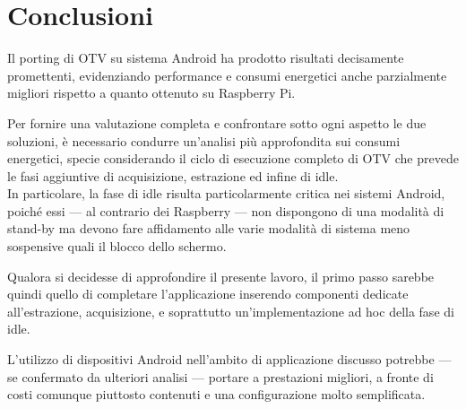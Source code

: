 \chapter*{Conclusioni}
\label{cap:conclusioni}

Il porting di OTV su sistema Android ha prodotto risultati decisamente promettenti, evidenziando performance e consumi
energetici anche parzialmente migliori rispetto a quanto ottenuto su Raspberry Pi.

Per fornire una valutazione completa e confrontare sotto ogni aspetto le due soluzioni, è necessario condurre un'analisi
più approfondita sui consumi energetici, specie considerando il ciclo di esecuzione completo di OTV che prevede le fasi
aggiuntive di acquisizione, estrazione ed infine di idle.\\
In particolare, la fase di idle risulta particolarmente critica nei sistemi Android, poiché essi --- al contrario dei Raspberry
--- non dispongono di una modalità di stand-by ma devono fare affidamento alle varie modalità di sistema meno sospensive quali 
il blocco dello schermo.

Qualora si decidesse di approfondire il presente lavoro, il primo passo sarebbe quindi quello di 
completare l'applicazione inserendo componenti dedicate all'estrazione, acquisizione, e soprattutto un'implementazione ad hoc
della fase di idle.

L'utilizzo di dispositivi Android nell'ambito di applicazione discusso potrebbe --- se confermato da ulteriori analisi ---
portare a prestazioni migliori, a fronte di costi comunque piuttosto contenuti e una configurazione molto semplificata.
